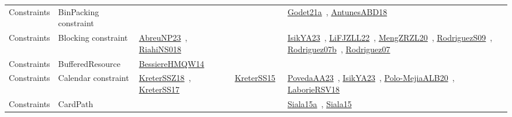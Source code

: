 {\begin{longtable}{lp{3cm}>{\raggedright\arraybackslash}p{6cm}>{\raggedright\arraybackslash}p{6cm}>{\raggedright\arraybackslash}p{8cm}}
Constraints & BinPacking constraint &  &  & \href{../works/Godet21a.pdf}{Godet21a}~\cite{Godet21a}, \href{../works/AntunesABD18.pdf}{AntunesABD18}~\cite{AntunesABD18}\\
Constraints & Blocking constraint & \href{../works/AbreuNP23.pdf}{AbreuNP23}~\cite{AbreuNP23}, \href{../works/RiahiNS018.pdf}{RiahiNS018}~\cite{RiahiNS018} &  & \href{../works/IsikYA23.pdf}{IsikYA23}~\cite{IsikYA23}, \href{../works/LiFJZLL22.pdf}{LiFJZLL22}~\cite{LiFJZLL22}, \href{../works/MengZRZL20.pdf}{MengZRZL20}~\cite{MengZRZL20}, \href{../works/RodriguezS09.pdf}{RodriguezS09}~\cite{RodriguezS09}, \href{../works/Rodriguez07b.pdf}{Rodriguez07b}~\cite{Rodriguez07b}, \href{../works/Rodriguez07.pdf}{Rodriguez07}~\cite{Rodriguez07}\\
Constraints & BufferedResource & \href{../works/BessiereHMQW14.pdf}{BessiereHMQW14}~\cite{BessiereHMQW14} &  & \\
Constraints & Calendar constraint & \href{../works/KreterSSZ18.pdf}{KreterSSZ18}~\cite{KreterSSZ18}, \href{../works/KreterSS17.pdf}{KreterSS17}~\cite{KreterSS17} & \href{../works/KreterSS15.pdf}{KreterSS15}~\cite{KreterSS15} & \href{../works/PovedaAA23.pdf}{PovedaAA23}~\cite{PovedaAA23}, \href{../works/IsikYA23.pdf}{IsikYA23}~\cite{IsikYA23}, \href{../works/Polo-MejiaALB20.pdf}{Polo-MejiaALB20}~\cite{Polo-MejiaALB20}, \href{../works/LaborieRSV18.pdf}{LaborieRSV18}~\cite{LaborieRSV18}\\
Constraints & CardPath &  &  & \href{../works/Siala15a.pdf}{Siala15a}~\cite{Siala15a}, \href{../works/Siala15.pdf}{Siala15}~\cite{Siala15}\\

\end{longtable}}
